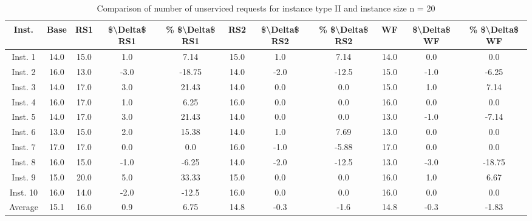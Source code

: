 \begin{table}[H]
\centering
\begin{tabular}{ccccccccccc}
  \hline
  \textbf{Inst.} & \textbf{Base} & \textbf{RS1} & \textbf{\$\textbackslash{}Delta\$  RS1} & \textbf{\% \$\textbackslash{}Delta\$  RS1} & \textbf{RS2} & \textbf{\$\textbackslash{}Delta\$  RS2} & \textbf{\% \$\textbackslash{}Delta\$  RS2} & \textbf{WF} & \textbf{\$\textbackslash{}Delta\$  WF} & \textbf{\% \$\textbackslash{}Delta\$  WF} \\\hline
  Inst. 1 & 14.0 & 15.0 & 1.0 & 7.14 & 15.0 & 1.0 & 7.14 & 14.0 & 0.0 & 0.0 \\
  Inst. 2 & 16.0 & 13.0 & -3.0 & -18.75 & 14.0 & -2.0 & -12.5 & 15.0 & -1.0 & -6.25 \\
  Inst. 3 & 14.0 & 17.0 & 3.0 & 21.43 & 14.0 & 0.0 & 0.0 & 15.0 & 1.0 & 7.14 \\
  Inst. 4 & 16.0 & 17.0 & 1.0 & 6.25 & 16.0 & 0.0 & 0.0 & 16.0 & 0.0 & 0.0 \\
  Inst. 5 & 14.0 & 17.0 & 3.0 & 21.43 & 14.0 & 0.0 & 0.0 & 13.0 & -1.0 & -7.14 \\
  Inst. 6 & 13.0 & 15.0 & 2.0 & 15.38 & 14.0 & 1.0 & 7.69 & 13.0 & 0.0 & 0.0 \\
  Inst. 7 & 17.0 & 17.0 & 0.0 & 0.0 & 16.0 & -1.0 & -5.88 & 17.0 & 0.0 & 0.0 \\
  Inst. 8 & 16.0 & 15.0 & -1.0 & -6.25 & 14.0 & -2.0 & -12.5 & 13.0 & -3.0 & -18.75 \\
  Inst. 9 & 15.0 & 20.0 & 5.0 & 33.33 & 15.0 & 0.0 & 0.0 & 16.0 & 1.0 & 6.67 \\
  Inst. 10 & 16.0 & 14.0 & -2.0 & -12.5 & 16.0 & 0.0 & 0.0 & 16.0 & 0.0 & 0.0 \\
  Average & 15.1 & 16.0 & 0.9 & 6.75 & 14.8 & -0.3 & -1.6 & 14.8 & -0.3 & -1.83 \\\hline
\end{tabular}
\caption{Comparison of number of unserviced requests for instance type II and instance size n = 20}
\label{tab:wait:resrelocation-nTaxi-comparison_II_20}
\end{table}
